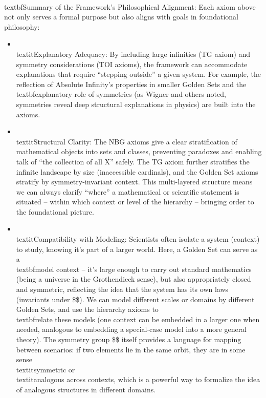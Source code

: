 \documentclass[11pt]{article}
\begin{document}
\\textbf{Summary of the Framework’s Philosophical Alignment:} Each axiom above not only serves a formal purpose but also aligns with goals in foundational philosophy:
\begin{itemize}
\item \\textit{Explanatory Adequacy:} By including large infinities (TG axiom) and symmetry considerations (TOI axioms), the framework can accommodate explanations that require “stepping outside” a given system. For example, the reflection of Absolute Infinity’s properties in smaller Golden Sets and the \\textbf{explanatory role of symmetries} (as Wigner and others noted, symmetries reveal deep structural explanations in physics) are built into the axioms.
\item \\textit{Structural Clarity:} The NBG axioms give a clear stratification of mathematical objects into sets and classes, preventing paradoxes and enabling talk of “the collection of all X” safely. The TG axiom further stratifies the infinite landscape by size (inaccessible cardinals), and the Golden Set axioms stratify by symmetry-invariant context. This multi-layered structure means we can always clarify “where” a mathematical or scientific statement is situated – within which context or level of the hierarchy – bringing order to the foundational picture.
\item \\textit{Compatibility with Modeling:} Scientists often isolate a system (context) to study, knowing it’s part of a larger world. Here, a Golden Set can serve as a \\textbf{model context} – it’s large enough to carry out standard mathematics (being a universe in the Grothendieck sense), but also appropriately closed and symmetric, reflecting the idea that the system has its own laws (invariants under \$\Sym\$). We can model different scales or domains by different Golden Sets, and use the hierarchy axioms to \\textbf{relate these models} (one context can be embedded in a larger one when needed, analogous to embedding a special-case model into a more general theory). The symmetry group \$\Sym\$ itself provides a language for mapping between scenarios: if two elements lie in the same orbit, they are in some sense \\textit{symmetric} or \\textit{analogous} across contexts, which is a powerful way to formalize the idea of analogous structures in different domains.
\end{itemize}
\end{document}
